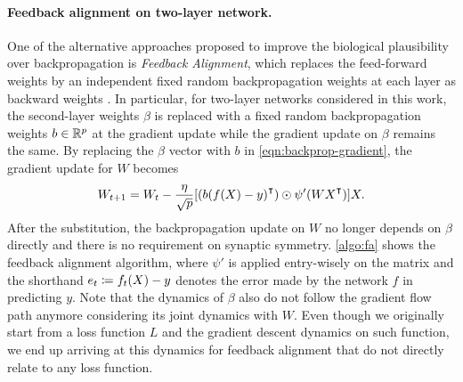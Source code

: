 \paragraph{Feedback alignment on two-layer network.}

One of the alternative approaches proposed to improve the biological plausibility over backpropagation is \emph{Feedback Alignment}, which replaces the feed-forward weights by an independent fixed random backpropagation weights at each layer as backward weights \citep{lillicrap2016random}. In particular, for two-layer networks considered in this work, the second-layer weights $\beta$ is replaced with a fixed random backpropagation weights $b\in{\mathbb{R}^{p}}$ at the gradient update while the gradient update on $\beta$ remains the same. By replacing the $\beta$ vector with $b$ in \cref{eqn:backprop-gradient}, the gradient update for $W$ becomes
\begin{align}\label{eqn:alignment-update}
    W_{t+1} = W_t - \frac{\eta}{\sqrt{p}} [(b (f(X) - y)\transpose)\odot \psi'(WX\transpose)] X.
\end{align}
After the substitution, the backpropagation update on $W$ no longer depends on $\beta$ directly and there is no requirement on synaptic symmetry. \cref{algo:fa} shows the feedback alignment algorithm, where $\psi'$ is applied entry-wisely on the matrix and the shorthand $e_t \coloneqq f_t(X) -y$ denotes the error made by the network $f$ in predicting $y$.  Note that the dynamics of $\beta$ also do not follow the gradient flow path anymore considering its joint dynamics with $W$. Even though we originally start from a loss function $L$ and the gradient descent dynamics on such function, we end up arriving at this dynamics for feedback alignment that do not directly relate to any loss function.

